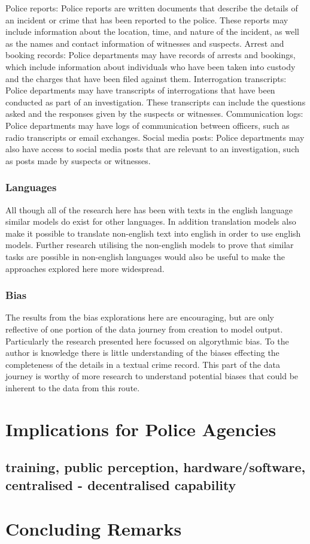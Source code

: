 Police reports: Police reports are written documents that describe the details of an incident or crime that has been reported to the police. These reports may include information about the location, time, and nature of the incident, as well as the names and contact information of witnesses and suspects.
Arrest and booking records: Police departments may have records of arrests and bookings, which include information about individuals who have been taken into custody and the charges that have been filed against them.
Interrogation transcripts: Police departments may have transcripts of interrogations that have been conducted as part of an investigation. These transcripts can include the questions asked and the responses given by the suspects or witnesses.
Communication logs: Police departments may have logs of communication between officers, such as radio transcripts or email exchanges.
Social media posts: Police departments may also have access to social media posts that are relevant to an investigation, such as posts made by suspects or witnesses.

\subsubsection{Languages} All though all of the research here has been with texts in the english language similar models do exist for other languages. In addition translation models also make it possible to translate non-english text into english in order to use english models. Further research utilising the non-english models to prove that similar tasks are possible in non-english languages would also be useful to make the approaches explored here more widespread. 

\subsubsection{Bias} The results from the bias explorations here are encouraging, but are only reflective of one portion of the data journey from creation to model output. Particularly the research presented here focussed on algorythmic bias. To the author is knowledge there is little understanding of the biases effecting the completeness of the details in a textual crime record. This part of the data journey is worthy of more research to understand potential biases that could be inherent to the data from this route.


\section{Implications for Police Agencies}

\subsection{training, public perception, hardware/software, centralised - decentralised capability}


\section{Concluding Remarks}






